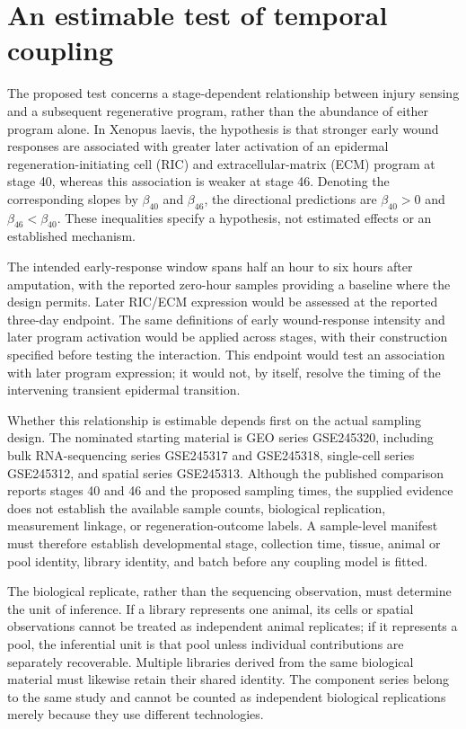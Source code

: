 \documentclass[11pt]{article}
\begin{document}
\section{An estimable test of temporal coupling}
The proposed test concerns a stage-dependent relationship between injury sensing and a subsequent regenerative program, rather than the abundance of either program alone. In Xenopus laevis, the hypothesis is that stronger early wound responses are associated with greater later activation of an epidermal regeneration-initiating cell (RIC) and extracellular-matrix (ECM) program at stage 40, whereas this association is weaker at stage 46. Denoting the corresponding slopes by $\beta_{40}$ and $\beta_{46}$, the directional predictions are $\beta_{40}>0$ and $\beta_{46}<\beta_{40}$. These inequalities specify a hypothesis, not estimated effects or an established mechanism.

The intended early-response window spans half an hour to six hours after amputation, with the reported zero-hour samples providing a baseline where the design permits. Later RIC/ECM expression would be assessed at the reported three-day endpoint. The same definitions of early wound-response intensity and later program activation would be applied across stages, with their construction specified before testing the interaction. This endpoint would test an association with later program expression; it would not, by itself, resolve the timing of the intervening transient epidermal transition.

Whether this relationship is estimable depends first on the actual sampling design. The nominated starting material is GEO series GSE245320, including bulk RNA-sequencing series GSE245317 and GSE245318, single-cell series GSE245312, and spatial series GSE245313. Although the published comparison reports stages 40 and 46 and the proposed sampling times, the supplied evidence does not establish the available sample counts, biological replication, measurement linkage, or regeneration-outcome labels. A sample-level manifest must therefore establish developmental stage, collection time, tissue, animal or pool identity, library identity, and batch before any coupling model is fitted.

The biological replicate, rather than the sequencing observation, must determine the unit of inference. If a library represents one animal, its cells or spatial observations cannot be treated as independent animal replicates; if it represents a pool, the inferential unit is that pool unless individual contributions are separately recoverable. Multiple libraries derived from the same biological material must likewise retain their shared identity. The component series belong to the same study and cannot be counted as independent biological replications merely because they use different technologies.
\end{document}
